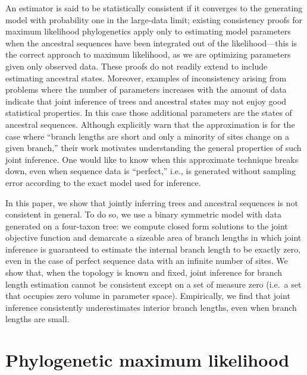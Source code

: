 \documentclass[11pt]{article}
\begin{document}
An estimator is said to be statistically consistent if it converges to the generating model with probability one in the large-data limit; existing consistency proofs for maximum likelihood phylogenetics \citep{Allman2008-wd,Chai2011-ff,RoyChoudhury2015-ta} apply only to estimating model parameters when the ancestral sequences have been integrated out of the likelihood---this is the correct approach to maximum likelihood, as we are optimizing parameters given only observed data.
These proofs do not readily extend to include estimating ancestral states.
Moreover, examples of inconsistency arising from problems where the number of parameters increases with the amount of data \citep{Neyman1948-tt} indicate that joint inference of trees and ancestral states may not enjoy good statistical properties.
In this case those additional parameters are the states of ancestral sequences.
Although \citet{Sagulenko2018-xl} explicitly warn that the approximation is for the case where ``branch lengths are short and only a minority of sites change on a given branch,'' their work motivates understanding the general properties of such joint inference.
One would like to know when this approximate technique breaks down, even when sequence data is ``perfect,'' i.e., is generated without sampling error according to the exact model used for inference.

In this paper, we show that jointly inferring trees and ancestral sequences is not consistent in general.
To do so, we use a binary symmetric model with data generated on a four-taxon tree: we compute closed form solutions to the joint objective function and demarcate a sizeable area of branch lengths in which joint inference is guaranteed to estimate the internal branch length to be exactly zero, even in the case of perfect sequence data with an infinite number of sites.
We show that, when the topology is known and fixed, joint inference for branch length estimation cannot be consistent except on a set of measure zero (i.e.\ a set that occupies zero volume in parameter space).
Empirically, we find that joint inference consistently underestimates interior branch lengths, even when branch lengths are small.

\section*{Phylogenetic maximum likelihood}
\end{document}

